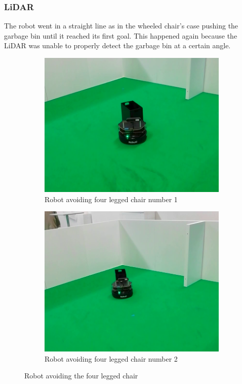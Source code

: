 \subsubsection*{LiDAR}
The robot went in a straight line as in the wheeled chair's case pushing the garbage bin until it reached its first goal. This happened again because the \ac{LiDAR} was unable to properly detect the garbage bin at a certain angle. 
\begin{figure}[h!]
  \centering
  \begin{subfigure}[b]{0.49\linewidth}
    \includegraphics[width=\linewidth]{imgs/chapter5/garbageLF.png}
     \caption{Robot avoiding four legged chair number 1}
     \label{fig::wchair}
  \end{subfigure}
  \begin{subfigure}[b]{0.49\linewidth}
    \includegraphics[width=\linewidth]{imgs/chapter5/garbageLF2.png}
    \caption{Robot avoiding four legged chair number 2}
    \label{fig::nchair}
  \end{subfigure}
  \caption{Robot avoiding the four legged chair}
  \label{fig:nchairRS}
\end{figure}



